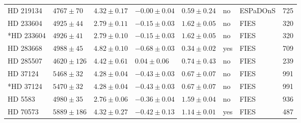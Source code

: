 \documentclass{aa}
\begin{document}
\begin{table}[htb!]
\begin{tabular}{llllllll}
    HD 219134     &  $4767 \pm  70$      &  $4.32 \pm 0.17$    &  $-0.00 \pm 0.04$    &  $0.59 \pm 0.24$             &             no              & ESPaDOnS     &  725  \\  %
    HD 233604     &  $4925 \pm  44$      &  $2.79 \pm 0.11$    &  $-0.15 \pm 0.03$    &  $1.62 \pm 0.05$             &             no              & FIES         &  320  \\  %
   *HD 233604     &  $4926 \pm  41$      &  $2.79 \pm 0.10$	   &  $-0.15 \pm 0.03$    &  $1.62 \pm 0.05$             &             no              & FIES         &  320  \\
    HD 283668     &  $4988 \pm  45$      &  $4.82 \pm 0.10$	   &  $-0.68 \pm 0.03$    &  $0.34 \pm 0.02$             &             yes             & FIES         &  709  \\
    HD 285507     &  $4620 \pm 126$      &  $4.42 \pm 0.61$    &  $ 0.04 \pm 0.06$    &  $0.74 \pm 0.43$             &             no              & FIES         &  239  \\  %
     HD 37124     &  $5468 \pm  32$      &  $4.28 \pm 0.04$    &  $-0.43 \pm 0.03$    &  $0.67 \pm 0.07$             &             no              & FIES         &  991  \\  %
    *HD 37124     &  $5470 \pm  32$      &  $4.28 \pm 0.04$	   &  $-0.43 \pm 0.03$    &  $0.67 \pm 0.07$             &             no              & FIES         &  991  \\
      HD 5583     &  $4980 \pm  35$      &  $2.76 \pm 0.06$    &  $-0.36 \pm 0.04$    &  $1.59 \pm 0.04$             &             no              & FIES         &  936  \\
     HD 70573     &  $5889 \pm 186$      &  $4.32 \pm 0.27$    &  $-0.42 \pm 0.13$    &  $1.14 \pm 0.01$             &             yes             & FIES         &  487  \\  %

\end{tabular}
\end{table}
\end{document}
